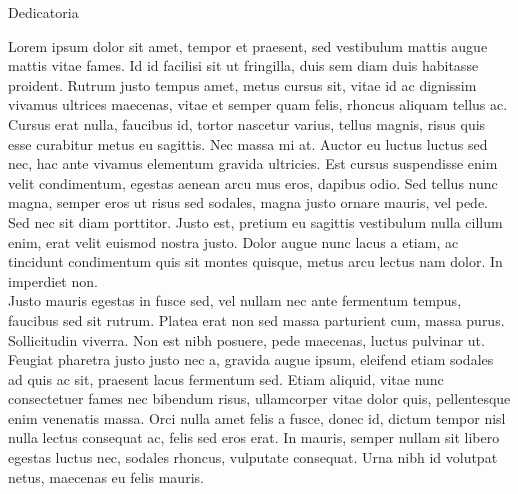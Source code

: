 \begin{center}
\large{Dedicatoria}\\
\end{center}
Lorem ipsum dolor sit amet, tempor et praesent, sed vestibulum mattis augue mattis vitae fames. Id id facilisi sit ut fringilla, duis sem diam duis habitasse proident. Rutrum justo tempus amet, metus cursus sit, vitae id ac dignissim vivamus ultrices maecenas, vitae et semper quam felis, rhoncus aliquam tellus ac. Cursus erat nulla, faucibus id, tortor nascetur varius, tellus magnis, risus quis esse curabitur metus eu sagittis. Nec massa mi at. Auctor eu luctus luctus sed nec, hac ante vivamus elementum gravida ultricies. Est cursus suspendisse enim velit condimentum, egestas aenean arcu mus eros, dapibus odio. Sed tellus nunc magna, semper eros ut risus sed sodales, magna justo ornare mauris, vel pede. Sed nec sit diam porttitor. Justo est, pretium eu sagittis vestibulum nulla cillum enim, erat velit euismod nostra justo. Dolor augue nunc lacus a etiam, ac tincidunt condimentum quis sit montes quisque, metus arcu lectus nam dolor. In imperdiet non. \\

Justo mauris egestas in fusce sed, vel nullam nec ante fermentum tempus, faucibus sed sit rutrum. Platea erat non sed massa parturient cum, massa purus. Sollicitudin viverra. Non est nibh posuere, pede maecenas, luctus pulvinar ut. Feugiat pharetra justo justo nec a, gravida augue ipsum, eleifend etiam sodales ad quis ac sit, praesent lacus fermentum sed. Etiam aliquid, vitae nunc consectetuer fames nec bibendum risus, ullamcorper vitae dolor quis, pellentesque enim venenatis massa. Orci nulla amet felis a fusce, donec id, dictum tempor nisl nulla lectus consequat ac, felis sed eros erat. In mauris, semper nullam sit libero egestas luctus nec, sodales rhoncus, vulputate consequat. Urna nibh id volutpat netus, maecenas eu felis mauris.\\